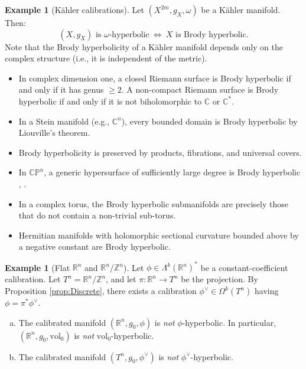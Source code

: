 \documentclass[11pt]{article}
\newcommand{\Z}{\mathbb{Z}}
\newcommand{\R}{\mathbb{R}}
\newcommand{\C}{\mathbb{C}}
\newcommand{\CP}{\mathbb{CP}}
\newcommand{\vol}{\mathrm{vol}}
\theoremstyle{definition}
\newtheorem{example}[thm]{Example}
\numberwithin{equation}{section}
\begin{document}
\begin{example}[K\"{a}hler calibrations]  Let $(X^{2m}, g_X, \omega)$ be a K\"{a}hler manifold.  Then:
$$(X, g_X) \text{ is }\omega\text{-hyperbolic} \ \iff \ X \text{ is Brody hyperbolic.}$$
Note that the Brody hyperbolicity of a K\"{a}hler manifold depends only on the complex structure (i.e., it is independent of the metric).
\begin{itemize}
\item In complex dimension one, a closed Riemann surface is Brody hyperbolic if and only if it has genus $\geq 2$.  A non-compact Riemann surface is Brody hyperbolic if and only if it is not biholomorphic to $\C$ or $\C^*$.
\item In a Stein manifold (e.g., $\C^n$), every bounded domain is Brody hyperbolic by Liouville's theorem.
\item Brody hyperbolicity is preserved by products, fibrations, and universal covers.
\item In $\CP^n$, a generic hypersurface of sufficiently large degree is Brody hyperbolic \cite{siu2015hyperbolicity}, \cite{brotbek2017hyperbolicity}.
\item In a complex torus, the Brody hyperbolic submanifolds are precisely those that do not contain a non-trivial sub-torus.
\item Hermitian manifolds with holomorphic sectional curvature bounded above by a negative constant are Brody hyperbolic.
\end{itemize}
\end{example}

\begin{example}[Flat $\R^n$ and $\R^n/\Z^n$] \label{example:Flat} Let $\phi \in \Lambda^k(\R^n)^*$ be a constant-coefficient calibration.  Let $T^n = \R^n/\Z^n$, and let $\pi \colon \R^n \to T^n$ be the projection.  By Proposition \ref{prop:Discrete}, there exists a calibration $\phi^\vee \in \Omega^k(T^n)$ having $\phi = \pi^*\phi^\vee$.
\begin{enumerate}[(a)]
\item The calibrated manifold $(\R^n, g_0, \phi)$ is \emph{not} $\phi$-hyperbolic.  In particular, $(\R^n, g_0, \vol_0)$ is \emph{not} $\vol_0$-hyperbolic.
\item The calibrated manifold $(T^n, g_0, \phi^\vee)$ is \emph{not} $\phi^\vee$-hyperbolic.
\end{enumerate}
\end{example}
\end{document}

